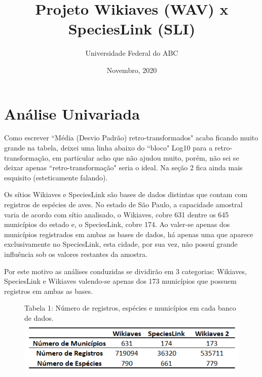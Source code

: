 \documentclass[12pt]{extarticle}
\title{Projeto Wikiaves (WAV) x SpeciesLink (SLI)}
\author{Universidade Federal do ABC}
\date{Novembro, 2020}
\newcommand{\asp}[1]{``#1"}
\newenvironment{resposta}{ \color{mygray}}{}
\begin{document}
\maketitle


\section{Análise Univariada}

\hrulefill

Como escrever \asp{Média (Desvio Padrão) retro-transformados} acaba ficando muito grande na tabela, deixei uma linha abaixo do \asp{bloco} Log10 para a retro-transformação, em particular acho que não ajudou muito, porém, não sei se deixar apenas \asp{retro-transformação} seria o ideal. Na seção 2 fica ainda mais esquisito (esteticamente falando).

\hrulefill


\begin{resposta}
Os sítios Wikiaves e SpeciesLink são bases de dados distintas que contam com registros de espécies de aves. No estado de São Paulo, a capacidade amostral varia de acordo com sítio analisado, o Wikiaves, cobre 631 dentre os 645 municípios do estado e, o SpeciesLink, cobre 174. Ao valer-se apenas dos municípios registrados em ambas as bases de dados, há apenas uma que aparece exclusivamente no SpeciesLink, esta cidade, por sua vez, não possuí grande influência sob os valores restantes da amostra. 

Por este motivo as análises conduzidas se dividirão em 3 categorias: Wikiaves, SpeciesLink e Wikiaves valendo-se apenas dos 173 municípios que possuem registros em ambas as bases.

\end{resposta}

\begin{figure}[h!]
\centering
{\scriptsize Tabela 1: Número de registros, espécies e municípios em cada banco de dados.}
\includegraphics{Imagens/T01.png}
\end{figure}
\end{document}
